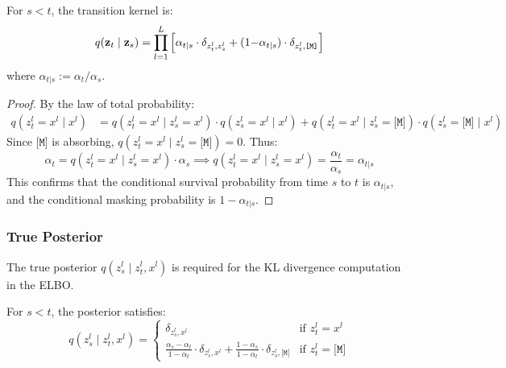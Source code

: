 \begin{lemma}
\label{lem:transition}
For $s < t$, the transition kernel is:
\begin{equation}
    q(\mathbf{z}_t \mid \mathbf{z}_s) = \prod_{l=1}^{L} \left[\alpha_{t|s} \cdot \delta_{z^l_t, z^l_s} + (1{-}\alpha_{t|s}) \cdot \delta_{z^l_t, \texttt{[M]}}\right]
\end{equation}
where $\alpha_{t|s} := \alpha_t / \alpha_s$.
\end{lemma}

\begin{proof}
By the law of total probability:
\begin{align}
    q(z^l_t = x^l \mid x^l) &= q(z^l_t = x^l \mid z^l_s = x^l) \cdot q(z^l_s = x^l \mid x^l) + q(z^l_t = x^l \mid z^l_s = \texttt{[M]}) \cdot q(z^l_s = \texttt{[M]} \mid x^l)
\end{align}
Since $\texttt{[M]}$ is absorbing, $q(z^l_t = x^l \mid z^l_s = \texttt{[M]}) = 0$. Thus:
\begin{equation}
    \alpha_t = q(z^l_t = x^l \mid z^l_s = x^l) \cdot \alpha_s \implies q(z^l_t = x^l \mid z^l_s = x^l) = \frac{\alpha_t}{\alpha_s} = \alpha_{t|s}
\end{equation}
This confirms that the conditional survival probability from time $s$ to $t$ is $\alpha_{t|s}$, and the conditional masking probability is $1 - \alpha_{t|s}$.
\end{proof}

\subsubsection{True Posterior}

The true posterior $q(z^l_s \mid z^l_t, x^l)$ is required for the KL divergence computation in the ELBO.

\begin{lemma}
\label{lem:posterior}
For $s < t$, the posterior satisfies:
\begin{equation}
    q(z^l_s \mid z^l_t, x^l) = \begin{cases}
        \delta_{z^l_s, x^l} & \text{if } z^l_t = x^l \\[0.5em]
        \frac{\alpha_s - \alpha_t}{1 - \alpha_t} \cdot \delta_{z^l_s, x^l} + \frac{1 - \alpha_s}{1 - \alpha_t} \cdot \delta_{z^l_s, \texttt{[M]}} & \text{if } z^l_t = \texttt{[M]}
    \end{cases}
\end{equation}
\end{lemma}

